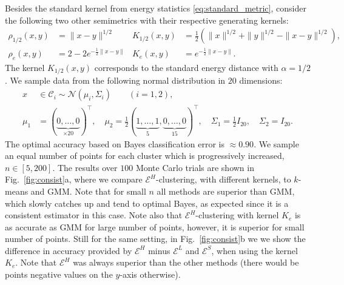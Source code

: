 \documentclass[aps,preprint,nofootinbib,floatfix]{revtex4-1}
\newcommand\kk{K}
\newcommand\C{{\mathcal{C}}}
\begin{document}
Besides the standard kernel from energy statistics 
\eqref{eq:standard_metric}, 
consider the following two other semimetrics with their respective generating
kernels:
\begin{align}
\rho_{1/2}(x,y) &= \| x-y \|^{1/2} & 
 \kk_{1/2}(x,y) &= \tfrac{1}{2} \left( 
\| x \|^{1/2} + \| y \|^{1/2} 
- \| x-y \|^{1/2} \right), \label{eq:rhohalf}\\
\rho_{e}(x,y) &= 
2 - 2 e^{-\tfrac{1}{2}\| x- y\|} &
 \kk_{e}(x,y) &= e^{-\tfrac{1}{2}\| x-y\|}.
\label{eq:rhoe}
\end{align}
The kernel $K_{1/2}(x,y)$ corresponds to the standard energy distance
with $\alpha=1/2$.
We sample data from the following normal distribution in $20$ dimensions:
\begin{equation}
\label{eq:20gauss}
\begin{split}
x &\in \C_i \sim \mathcal{N}(\mu_i,\Sigma_i) \qquad (i=1,2), \\
\mu_1 &= (\underbrace{0,\dotsc,0}_{\times 20})^\top ,\quad
\mu_2 = \tfrac{1}{2} 
(\underbrace{1,\dotsc,1}_{5},\underbrace{0,\dotsc,0}_{15})^\top, \quad
\Sigma_1 = \tfrac{1}{2} I_{20},  \quad
\Sigma_2 = I_{20}.
\end{split}
\end{equation}
The optimal accuracy based on Bayes
classification error is $\approx 0.90$. 
We sample an equal number of points for each cluster which is progressively
increased, $n \in [5, 200]$. 
The results over $100$ Monte Carlo trials are 
shown in Fig.~\ref{fig:consist}a, where we compare
$\mathcal{E}^H$-clustering, with different
kernels, to $k$-means and GMM.
Note that for small $n$ all methods
are superior than GMM, which slowly catches up and tend to optimal Bayes,
as expected since it is a consistent estimator in this case. 
Note also that $\mathcal{E}^H$-clustering
with kernel $\kk_e$ is as accurate as GMM for large number of points, however,
it is superior for small number of points. Still for
the same setting, in Fig.~\ref{fig:consist}b we
we show the difference in accuracy provided by $\mathcal{E}^H$ minus
$\mathcal{E}^L$ and $\mathcal{E}^S$, when using the
kernel $\kk_e$.
Note that $\mathcal{E}^H$ was
always superior than the other 
methods (there would be points negative values on the $y$-axis otherwise).
\end{document}
